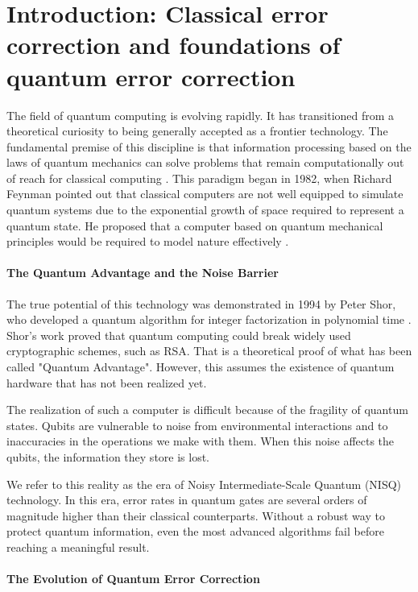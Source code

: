 \chapter{Introduction: Classical error correction and foundations of quantum error correction}
\label{chap:introduction}

The field of quantum computing is evolving rapidly. It has transitioned from a theoretical curiosity to being generally accepted as a frontier technology. The fundamental premise of this discipline is that information processing based on the laws of quantum mechanics can solve problems that remain computationally out of reach for classical computing \cite{nielsen2010quantum}. This paradigm began in 1982, when Richard Feynman pointed out that classical computers are not well equipped to simulate quantum systems due to the exponential growth of space required to represent a quantum state. He proposed that a computer based on quantum mechanical principles would be required to model nature effectively \cite{feynman1982simulating}.

\subsubsection*{The Quantum Advantage and the Noise Barrier}

The true potential of this technology was demonstrated in 1994 by Peter Shor, who developed a quantum algorithm for integer factorization in polynomial time \cite{shor1994algorithms}. Shor's work proved that quantum computing could break widely used cryptographic schemes, such as RSA. That is a theoretical proof of what has been called "Quantum Advantage". However, this assumes the existence of quantum hardware that has not been realized yet.

The realization of such a computer is difficult because of the fragility of quantum states. Qubits are vulnerable to noise from environmental interactions and to inaccuracies in the operations we make with them. When this noise affects the qubits, the information they store is lost.

We refer to this reality as the era of Noisy Intermediate-Scale Quantum (NISQ) technology. In this era, error rates in quantum gates are several orders of magnitude higher than their classical counterparts. Without a robust way to protect quantum information, even the most advanced algorithms fail before reaching a meaningful result.

\subsubsection*{The Evolution of Quantum Error Correction}

